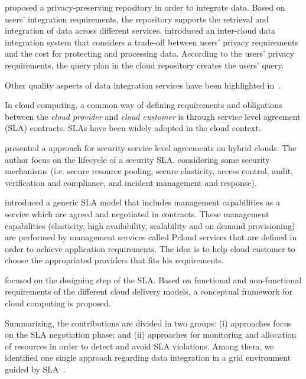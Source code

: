 \documentclass[12pt,a4paper,oneside]{report}
\begin{document}
\cite{YauY08} proposed a privacy-preserving repository in order to integrate data. 
Based on users' integration requirements, the repository supports the retrieval and integration of data across different services. 
\cite{096} introduced an inter-cloud data integration system that considers a trade-off between users' privacy requirements and the cost for protecting and processing data. According to the users' privacy requirements, the query plan in the cloud repository creates the users' query. 

Other quality aspects of data integration services have been highlighted in~\cite{Dustdar:2012}.


In cloud computing, a common way of defining requirements and obligations between the \textit{cloud provider} and \textit{cloud customer} is through service level agreement (SLA) contracts. 
SLAs have been widely adopted in the cloud context. 

\cite{011} presented a approach for security service level agreements on hybrid clouds. The author focus on the lifecycle of a security SLA, considering some security mechanisms (i.e. secure resource pooling, secure elasticity, access control, audit, verification and compliance, and incident management and response).

\cite{009} introduced a generic SLA model that includes management capabilities as a service which are agreed and negotiated in contracts. These management capabilities (elasticity, high availability, scalability and on demand provisioning) are performed by management services called Pcloud services that are defined in order to achieve application requirements. The idea is to help cloud customer to choose the appropriated providers that fits his requirements. 

\cite{005} focused on the designing step of the SLA. 
Based on functional and non-functional requirements of the different cloud delivery models, a conceptual framework for cloud computing is proposed. 

Summarizing, the contributions are divided in two groups: (i) approaches focus on the SLA negotiation phase; and (ii) approaches for monitoring and allocation of resources in order to detect and avoid SLA violations. Among them, we identified one single approach regarding data integration in a grid environment guided by SLA~\cite{Nie07}.
\end{document}
